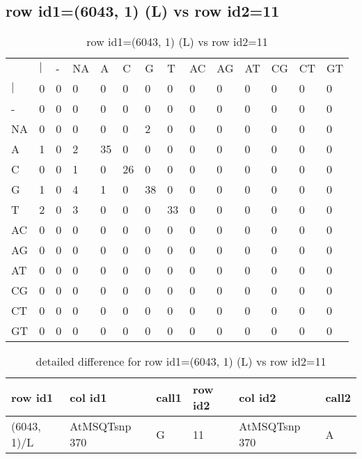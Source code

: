 \subsection{row id1=(6043, 1) (L) vs row id2=11}
\begin{center}
\begin{longtable}{|l|l|l|l|l|l|l|l|l|l|l|l|l|l|}
\caption{row id1=(6043, 1) (L) vs row id2=11} \label{table_dm30}\\
\hline
\\
\hline
&$|$&-&NA&A&C&G&T&AC&AG&AT&CG&CT&GT\\
$|$&0&0&0&0&0&0&0&0&0&0&0&0&0\\
-&0&0&0&0&0&0&0&0&0&0&0&0&0\\
NA&0&0&0&0&0&2&0&0&0&0&0&0&0\\
A&1&0&2&35&0&0&0&0&0&0&0&0&0\\
C&0&0&1&0&26&0&0&0&0&0&0&0&0\\
G&1&0&4&1&0&38&0&0&0&0&0&0&0\\
T&2&0&3&0&0&0&33&0&0&0&0&0&0\\
AC&0&0&0&0&0&0&0&0&0&0&0&0&0\\
AG&0&0&0&0&0&0&0&0&0&0&0&0&0\\
AT&0&0&0&0&0&0&0&0&0&0&0&0&0\\
CG&0&0&0&0&0&0&0&0&0&0&0&0&0\\
CT&0&0&0&0&0&0&0&0&0&0&0&0&0\\
GT&0&0&0&0&0&0&0&0&0&0&0&0&0\\
\hline
\end{longtable}
\end{center}

\begin{center}
\begin{longtable}{|l|l|l|l|l|l|}
\caption{detailed difference for row id1=(6043, 1) (L) vs row id2=11} \label{table_dm31}\\
\hline
row id1&col id1&call1&row id2&col id2&call2\\
\hline
(6043, 1)/L&AtMSQTsnp 370&G&11&AtMSQTsnp 370&A\\
\hline
\end{longtable}
\end{center}

